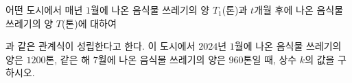 어떤 도시에서 매년 $1$월에 나온 음식물 쓰레기의 양 $T_1$(톤)과 $t$개월 후에 나온 음식물 쓰레기의 양 $T$(톤)에 대하여 \par\smallskip{}\par\smallskip\noindent 과 같은 관계식이 성립한다고 한다. 이 도시에서 $2024$년 $1$월에 나온 음식물 쓰레기의 양은 $1200$톤, 같은 해 $7$월에 나온 음식물 쓰레기의 양은 $960$톤일 때, 상수 $k$의 값을 구하시오. 
